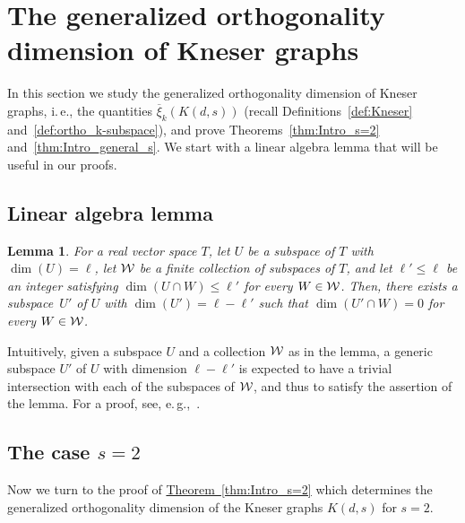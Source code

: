 \documentclass[11pt]{article}
\numberwithin{equation}{section}
\newtheorem{lemma}[theorem]{Lemma}
\theoremstyle{definition}
\theoremstyle{plain}
\newcommand{\ie}{i.\,e.}
\newcommand{\expref}[2]{\hyperref[#2]{#1~\ref{#2}}}
\newcommand{\od}{\overline{\xi}}
\newcommand{\calW}{{\cal W}}
\begin{document}
\section{The generalized orthogonality dimension of Kneser graphs}\label{sec:GenODofKneser}

In this section we study the generalized orthogonality dimension
%
%
of Kneser graphs, %
\ie,   %
the quantities $\od_k(K(d,s))$ (recall Definitions~\ref{def:Kneser} and~\ref{def:ortho_k-subspace}), and prove Theorems~\ref{thm:Intro_s=2} and~\ref{thm:Intro_general_s}.
We start with a linear algebra lemma that will be useful in our proofs.

\subsection{Linear algebra lemma}

%
%
%
%
\begin{lemma}\label{lem_cor:good_subspace}
For a real vector space $T$, let $U$ be a subspace of $T$ with $\dim(U) = \ell$, let $\calW$ be a finite collection of subspaces of $T$, and let $\ell' \leq \ell$ be an integer satisfying $\dim(U \cap W) \leq \ell'$ for every $W \in \calW$. Then, there exists a subspace~$U'$ of $U$ with $\dim(U')=\ell-\ell'$ such that $\dim(U' \cap W) = 0$ for every $W \in \calW$.
\end{lemma}

%
%

Intuitively, given a subspace $U$ and a collection $\calW$ as in the lemma, a
%
generic  %
subspace $U'$ of $U$ with dimension $\ell-\ell'$ is expected to have a trivial intersection with each of the subspaces of $\calW$, and thus to satisfy the assertion of the lemma.
%
%
For a proof, see, e.\,g.,~\cite[Chapter~3.1.4]{BabaiF20}.
%

%
%
%
%
%
%
%
%
%
%
%
%
%
%
%
%
%
%
%
%
%
%
%
%
%
%
%
%
%
%
%
%
%
%
%
%
%
%
%
%
%
%
%
%
%
%
%
%
%
%
%
%
%
%
%
%
%
%
%
%
%
%
%
%
%

\subsection{The case \texorpdfstring{$s=2$}{s=2}}

%
Now we turn to the proof of %
\expref{Theorem}{thm:Intro_s=2} which determines the generalized orthogonality dimension %
of the  %
Kneser graphs $K(d,s)$ for $s=2$.
\end{document}
